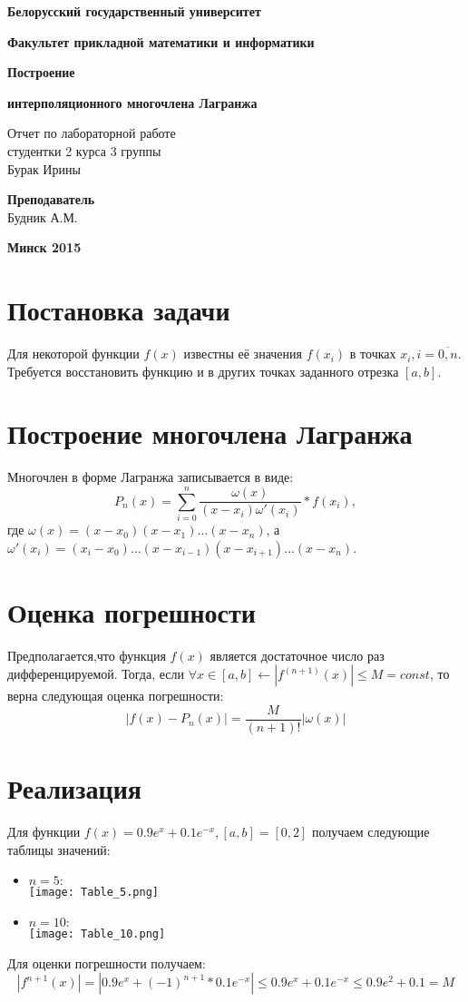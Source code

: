 \documentclass[12pt,a4paper]{article}
\begin{document}
	\begin{titlepage}
	
		\centerline{\large \bf Белорусский государственный университет}
		\centerline{\large \bf Факультет прикладной математики и информатики}
		\vfill
		\vfill
		\centerline{\Large \bf Построение}
		\centerline{\Large \bf интерполяционного многочлена Лагранжа}
		\bigskip
		\vfill
		\bigskip
		\vfill
		\begin{centering}
			{\large
				Отчет по лабораторной работе \\
				студентки 2 курса 3 группы \\
				Бурак Ирины \\
			}
		\end{centering}
		\vfill
		\vfill
		\hfill
		\begin{minipage}{0.25\textwidth}
			{\large{\bf Преподаватель} \\
				{Будник А.М.}}
		\end{minipage}
		\vfill
		\vfill
		\centerline{\Large \bf Минск 2015}
	\end{titlepage}
	\section{Постановка задачи}
	Для некоторой функции $f(x)$ известны её значения $f(x_i)$ в точках $x_i, i = \overline{0, n}$. Требуется восстановить функцию и в других точках заданного отрезка $[a, b]$. 
	\section{Построение многочлена Лагранжа}
	Многочлен в форме Лагранжа записывается в виде:
	$$P_n(x) = \sum_{i = 0}^{n}\frac{\omega(x)}{(x - x_i)\omega'(x_i)}*f(x_i),$$
	где $\omega(x) = (x - x_0)(x - x_1)\dots(x - x_n)$, а $\omega'(x_i) = (x_i - x_0)\dots(x - x_{i-1})(x - x_{i+1})\dots(x - x_n)$.
	\section{Оценка погрешности}
	Предполагается,что функция $f(x)$ является достаточное число раз дифференцируемой. Тогда, если $\forall x \in[a, b] \leftarrow |f^{(n+1)}(x)| \le M = const$, то верна следующая оценка погрешности:
	$$|f(x) - P_n(x)| = \frac{M}{(n+1)!}|\omega(x)|$$
	\section{Реализация}
	Для функции $f(x) = 0.9e^x + 0.1e^{-x}, [a, b] = [0, 2]$ получаем следующие таблицы значений:
	\begin{itemize}
		\item $n = 5:$ \\
		\texttt{[image: Table\_5.png]}
		\item $n = 10:$ \\
		\texttt{[image: Table\_10.png]}
	\end{itemize}
	Для оценки погрешности получаем: 
	$$|f^{n+1}(x)| = |0.9e^{x} + (-1)^{n+1}*0.1e^{-x}| \le 0.9e^{x} + 0.1e^{-x} \le 0.9e^2 + 0.1 = M$$
\end{document}
